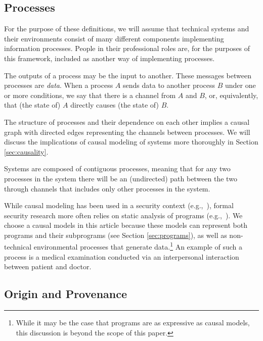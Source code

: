 \documentclass[../thesis.tex]{subfiles}
\begin{document}
\subsection{Processes}

For the purpose of these definitions, we will assume that
technical systems and their environments consist of many
different components implementing information processes.
People in their professional roles are, for the purposes of 
this framework, included as another way of implementing processes.

The outputs of a process may be the input to another.
These messages between processes are \emph{data}.
When a process $A$ sends data to another process $B$ under one or
more conditions, we say that there is a channel from $A$ and $B$,
or, equivalently, that (the state of) $A$ directly causes
(the state of) $B$.

The structure of processes and their dependence on each other
implies a causal graph \cite{pearl1988probabilistic} with directed
edges representing the channels between processes.
We will discuss the implications of causal modeling of systems
more thoroughly in Section \ref{sec:causality}.

%
%

Systems are composed of contiguous processes,
meaning that for any two processes in the system there will
be an (undirected) path between the two through channels that
includes only other processes in the system.

While causal modeling has been used in a security context
(e.g.,~\cite{feng2014security}), formal security research
more often relies on static analysis of programs (e.g.,~\cite{mclean90sp}).
We choose a causal models in this article because
these models can represent both programs and their
subprograms (see Section \ref{sec:programs}),
as well as non-technical environmental processes
that generate data.\footnote{While it may be the case that
  programs are as expressive as causal models, this
discussion is beyond the scope of this paper.}
An example of such a process is a medical examination
conducted via an interpersonal interaction between
patient and doctor.

\subsection{Origin and Provenance}
\end{document}
